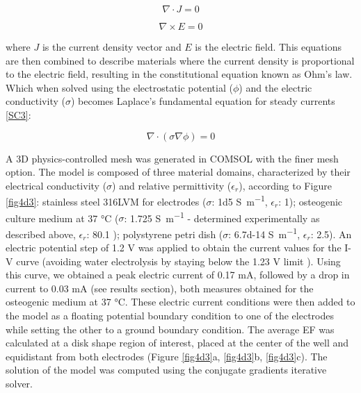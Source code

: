 \begin{equation}
\label{SC1}
\nabla \cdot J = 0
\end{equation}

\begin{equation}
\label{SC2}
\nabla \times E = 0
\end{equation}

\noindent where $J$ is the current density vector and $E$ is the electric field. This equations are then combined to describe materials where the current density is proportional to the electric field, resulting in the constitutional equation known as Ohm's law. Which when solved using the electrostatic potential ($\phi$) and the electric conductivity ($\sigma$) becomes Laplace's fundamental equation for steady currents \ref{SC3}:

\begin{equation}
\label{SC3}
\nabla \cdot (\sigma \nabla \phi) = 0
\end{equation}

A \ac{3D} physics-controlled mesh was generated in COMSOL with the finer mesh option. The model is composed of three material domains, characterized by their electrical conductivity ($\sigma$) and relative permittivity ($\epsilon_r$), according to Figure \ref{fig4d3}: stainless steel 316LVM for electrodes ($\sigma$: \num{1d5} \si{\siemens\per\meter}, $\epsilon_r$: 1); osteogenic culture medium at 37 \si{\celsius} ($\sigma$: \num{1.725} \si{\siemens\per\meter} - determined experimentally as described above, $\epsilon_r$: 80.1 \cite{Visone2018-sa}); polystyrene petri dish ($\sigma$: \num{6.7d-14}  \si{\siemens\per\meter}, $\epsilon_r$: 2.5). An electric potential step of 1.2 \si{\volt} was applied to obtain the current values for the I-V curve (avoiding water electrolysis by staying below the 1.23 \si{\volt} limit \cite{Guette-Marquet2021-rp}). Using this curve, we obtained a peak electric current of 0.17 \si{\milli\ampere}, followed by a drop in current to 0.03 \si{\milli\ampere} (see results section), both measures obtained for the osteogenic medium at 37 \si{\celsius}. These electric current conditions were then added to the model as a floating potential boundary condition to one of the electrodes while setting the other to a ground boundary condition. The average \acs{EF} was calculated at a disk shape region of interest, placed at the center of the well and equidistant from both electrodes (Figure \ref{fig4d3}a, \ref{fig4d3}b, \ref{fig4d3}c). The solution of the model was computed using the conjugate gradients iterative solver.


